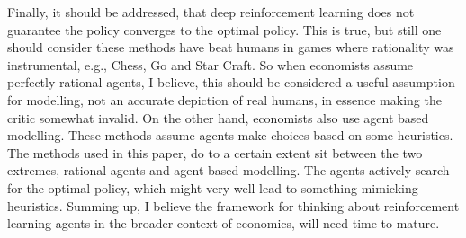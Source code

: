 Finally, it should be addressed, that deep reinforcement learning does not guarantee the policy converges to the optimal policy. This is true, but still one should consider these methods have beat humans in games where rationality was instrumental, e.g., Chess, Go and Star Craft. So when economists assume perfectly rational agents, I believe, this should be considered a useful assumption for modelling, not an accurate depiction of real humans, in essence making the critic somewhat invalid. On the other hand, economists also use agent based modelling. These methods assume agents make choices based on some heuristics. The methods used in this paper, do to a certain extent sit between the two extremes, rational agents and agent based modelling. The agents actively search for the optimal policy, which might very well lead to something mimicking heuristics. Summing up, I believe the framework for thinking about reinforcement learning agents in the broader context of economics, will need time to mature.
